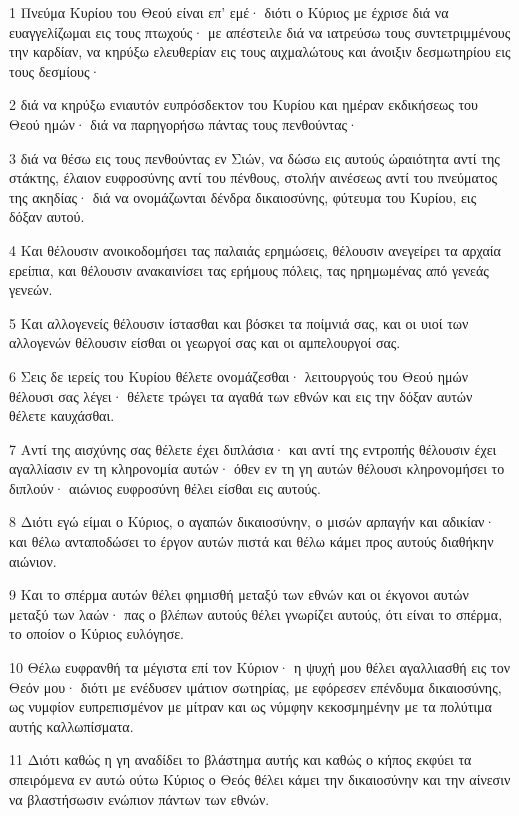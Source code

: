 \par 1 Πνεύμα Κυρίου του Θεού είναι επ' εμέ· διότι ο Κύριος με έχρισε διά να ευαγγελίζωμαι εις τους πτωχούς· με απέστειλε διά να ιατρεύσω τους συντετριμμένους την καρδίαν, να κηρύξω ελευθερίαν εις τους αιχμαλώτους και άνοιξιν δεσμωτηρίου εις τους δεσμίους·
\par 2 διά να κηρύξω ενιαυτόν ευπρόσδεκτον του Κυρίου και ημέραν εκδικήσεως του Θεού ημών· διά να παρηγορήσω πάντας τους πενθούντας·
\par 3 διά να θέσω εις τους πενθούντας εν Σιών, να δώσω εις αυτούς ώραιότητα αντί της στάκτης, έλαιον ευφροσύνης αντί του πένθους, στολήν αινέσεως αντί του πνεύματος της ακηδίας· διά να ονομάζωνται δένδρα δικαιοσύνης, φύτευμα του Κυρίου, εις δόξαν αυτού.
\par 4 Και θέλουσιν ανοικοδομήσει τας παλαιάς ερημώσεις, θέλουσιν ανεγείρει τα αρχαία ερείπια, και θέλουσιν ανακαινίσει τας ερήμους πόλεις, τας ηρημωμένας από γενεάς γενεών.
\par 5 Και αλλογενείς θέλουσιν ίστασθαι και βόσκει τα ποίμνιά σας, και οι υιοί των αλλογενών θέλουσιν είσθαι οι γεωργοί σας και οι αμπελουργοί σας.
\par 6 Σεις δε ιερείς του Κυρίου θέλετε ονομάζεσθαι· λειτουργούς του Θεού ημών θέλουσι σας λέγει· θέλετε τρώγει τα αγαθά των εθνών και εις την δόξαν αυτών θέλετε καυχάσθαι.
\par 7 Αντί της αισχύνης σας θέλετε έχει διπλάσια· και αντί της εντροπής θέλουσιν έχει αγαλλίασιν εν τη κληρονομία αυτών· όθεν εν τη γη αυτών θέλουσι κληρονομήσει το διπλούν· αιώνιος ευφροσύνη θέλει είσθαι εις αυτούς.
\par 8 Διότι εγώ είμαι ο Κύριος, ο αγαπών δικαιοσύνην, ο μισών αρπαγήν και αδικίαν· και θέλω ανταποδώσει το έργον αυτών πιστά και θέλω κάμει προς αυτούς διαθήκην αιώνιον.
\par 9 Και το σπέρμα αυτών θέλει φημισθή μεταξύ των εθνών και οι έκγονοι αυτών μεταξύ των λαών· πας ο βλέπων αυτούς θέλει γνωρίζει αυτούς, ότι είναι το σπέρμα, το οποίον ο Κύριος ευλόγησε.
\par 10 Θέλω ευφρανθή τα μέγιστα επί τον Κύριον· η ψυχή μου θέλει αγαλλιασθή εις τον Θεόν μου· διότι με ενέδυσεν ιμάτιον σωτηρίας, με εφόρεσεν επένδυμα δικαιοσύνης, ως νυμφίον ευπρεπισμένον με μίτραν και ως νύμφην κεκοσμημένην με τα πολύτιμα αυτής καλλωπίσματα.
\par 11 Διότι καθώς η γη αναδίδει το βλάστημα αυτής και καθώς ο κήπος εκφύει τα σπειρόμενα εν αυτώ ούτω Κύριος ο Θεός θέλει κάμει την δικαιοσύνην και την αίνεσιν να βλαστήσωσιν ενώπιον πάντων των εθνών.

